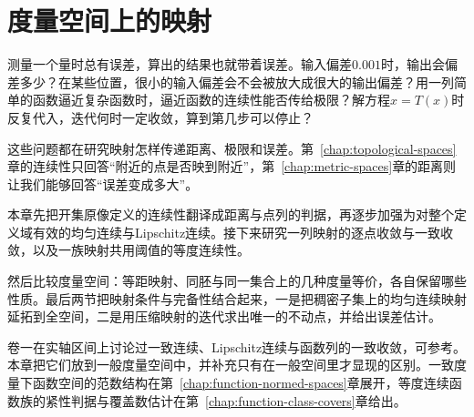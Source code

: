 \chapter{度量空间上的映射}
\label{chap:metric-space-maps}

测量一个量时总有误差，算出的结果也就带着误差。输入偏差$0.001$时，输出会偏差多少？在某些位置，很小的输入偏差会不会被放大成很大的输出偏差？用一列简单的函数逼近复杂函数时，逼近函数的连续性能否传给极限？解方程$x=T(x)$时反复代入，迭代何时一定收敛，算到第几步可以停止？

这些问题都在研究映射怎样传递距离、极限和误差。第~\ref{chap:topological-spaces}章的连续性只回答“附近的点是否映到附近”，第~\ref{chap:metric-spaces}章的距离则让我们能够回答“误差变成多大”。

本章先把开集原像定义的连续性翻译成距离与点列的判据，再逐步加强为对整个定义域有效的均匀连续与Lipschitz连续。接下来研究一列映射的逐点收敛与一致收敛，以及一族映射共用阈值的等度连续性。

然后比较度量空间：等距映射、同胚与同一集合上的几种度量等价，各自保留哪些性质。最后两节把映射条件与完备性结合起来，一是把稠密子集上的均匀连续映射延拓到全空间，二是用压缩映射的迭代求出唯一的不动点，并给出误差估计。

卷一在实轴区间上讨论过一致连续、Lipschitz连续与函数列的一致收敛，可参考。本章把它们放到一般度量空间中，并补充只有在一般空间里才显现的区别。一致度量下函数空间的范数结构在第~\ref{chap:function-normed-spaces}章展开，等度连续函数族的紧性判据与覆盖数估计在第~\ref{chap:function-class-covers}章给出。









